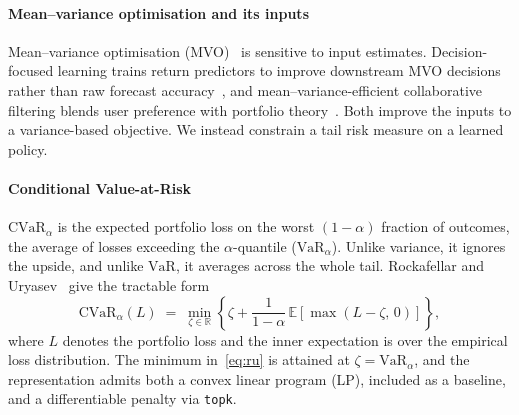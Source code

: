\documentclass[sigconf]{acmart}
\begin{document}
\paragraph{Mean--variance optimisation and its inputs} Mean--variance optimisation
(MVO)~\cite{markowitz1952portfolio} is sensitive to input estimates. Decision-focused
learning trains return predictors to improve downstream MVO decisions rather than raw forecast
accuracy~\cite{lee2024dfl}, and mean--variance-efficient collaborative filtering
blends user preference with portfolio theory~\cite{chung2023mvecf}. Both improve the
inputs to a variance-based objective. We instead constrain a tail risk
measure on a learned policy.

\paragraph{Conditional Value-at-Risk} $\mathrm{CVaR}_\alpha$ is the expected
portfolio loss on the worst $(1{-}\alpha)$ fraction of outcomes, the average of losses
exceeding the $\alpha$-quantile ($\mathrm{VaR}_\alpha$). Unlike variance, it ignores the
upside, and unlike $\mathrm{VaR}$, it averages across the whole tail. Rockafellar and
Uryasev~\cite{rockafellar2000optimization} give the tractable form
\begin{equation}\label{eq:ru}
  \mathrm{CVaR}_\alpha(L) \;=\; \min_{\zeta\in\mathbb{R}}\!\left\{
    \zeta + \frac{1}{1-\alpha}\,\mathbb{E}\!\left[\max(L-\zeta,\,0)\right]
  \right\},
\end{equation}
where $L$ denotes the portfolio loss and the inner expectation is over the empirical
loss distribution. The minimum in~\eqref{eq:ru} is attained at $\zeta=\mathrm{VaR}_\alpha$, and the
representation admits both a convex linear program (LP), included as a baseline, and a
differentiable penalty via \texttt{topk}.
\end{document}
